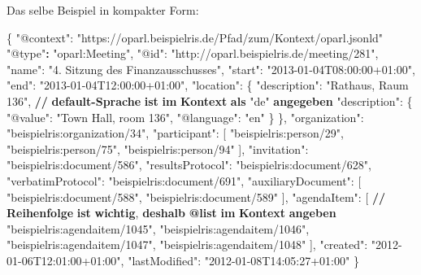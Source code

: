 \documentclass[,a4paper]{article}
\newenvironment{Shaded}{}{}
\newcommand{\DataTypeTok}[1]{\textcolor[rgb]{0.56,0.13,0.00}{{#1}}}
\newcommand{\StringTok}[1]{\textcolor[rgb]{0.25,0.44,0.63}{{#1}}}
\newcommand{\ErrorTok}[1]{\textcolor[rgb]{1.00,0.00,0.00}{\textbf{{#1}}}}
\newcommand{\NormalTok}[1]{{#1}}
\begin{document}
Das selbe Beispiel in kompakter Form:

\begin{Shaded}
\begin{Highlighting}[]
\NormalTok{\{}
    \DataTypeTok{"@context"}\NormalTok{: }\StringTok{"https://oparl.beispielris.de/Pfad/zum/Kontext/oparl.jsonld"}
    \StringTok{"@type"}\ErrorTok{:} \StringTok{"oparl:Meeting"}\NormalTok{,}
    \DataTypeTok{"@id"}\NormalTok{: }\StringTok{"http://oparl.beispielris.de/meeting/281"}\NormalTok{,}
    \DataTypeTok{"name"}\NormalTok{: }\StringTok{"4. Sitzung des Finanzausschusses"}\NormalTok{,}
    \DataTypeTok{"start"}\NormalTok{: }\StringTok{"2013-01-04T08:00:00+01:00"}\NormalTok{,}
    \DataTypeTok{"end"}\NormalTok{: }\StringTok{"2013-01-04T12:00:00+01:00"}\NormalTok{,}
    \DataTypeTok{"location"}\NormalTok{: \{}
        \DataTypeTok{"description"}\NormalTok{: }\StringTok{"Rathaus, Raum 136"}\NormalTok{, }\ErrorTok{//} \ErrorTok{default-Sprache} \ErrorTok{ist} \ErrorTok{im} \ErrorTok{Kontext} \ErrorTok{als} \DataTypeTok{"de"} \ErrorTok{angegeben}
        \DataTypeTok{"description"}\NormalTok{: \{}
            \DataTypeTok{"@value"}\NormalTok{: }\StringTok{"Town Hall, room 136"}\NormalTok{,}
            \DataTypeTok{"@language"}\NormalTok{: }\StringTok{"en"}
        \NormalTok{\}}
    \NormalTok{\},}
    \DataTypeTok{"organization"}\NormalTok{: }\StringTok{"beispielris:organization/34"}\NormalTok{,}
    \DataTypeTok{"participant"}\NormalTok{: [}
        \StringTok{"beispielris:person/29"}\NormalTok{,}
        \StringTok{"beispielris:person/75"}\NormalTok{,}
        \StringTok{"beispielris:person/94"}
    \NormalTok{],}
    \DataTypeTok{"invitation"}\NormalTok{: }\StringTok{"beispielris:document/586"}\NormalTok{,}
    \DataTypeTok{"resultsProtocol"}\NormalTok{: }\StringTok{"beispielris:document/628"}\NormalTok{,}
    \DataTypeTok{"verbatimProtocol"}\NormalTok{: }\StringTok{"beispielris:document/691"}\NormalTok{,}
    \DataTypeTok{"auxiliaryDocument"}\NormalTok{: [}
        \StringTok{"beispielris:document/588"}\NormalTok{,}
        \StringTok{"beispielris:document/589"}
    \NormalTok{],}
    \DataTypeTok{"agendaItem"}\NormalTok{: [}
    \ErrorTok{//} \ErrorTok{Reihenfolge} \ErrorTok{ist} \ErrorTok{wichtig}\NormalTok{, }\ErrorTok{deshalb} \ErrorTok{@list} \ErrorTok{im} \ErrorTok{Kontext} \ErrorTok{angeben}
        \StringTok{"beispielris:agendaitem/1045"}\NormalTok{,}
        \StringTok{"beispielris:agendaitem/1046"}\NormalTok{,}
        \StringTok{"beispielris:agendaitem/1047"}\NormalTok{,}
        \StringTok{"beispielris:agendaitem/1048"}
    \NormalTok{],}
    \DataTypeTok{"created"}\NormalTok{: }\StringTok{"2012-01-06T12:01:00+01:00"}\NormalTok{,}
    \DataTypeTok{"lastModified"}\NormalTok{: }\StringTok{"2012-01-08T14:05:27+01:00"}
\NormalTok{\}}
\end{Highlighting}
\end{Shaded}
\end{document}
